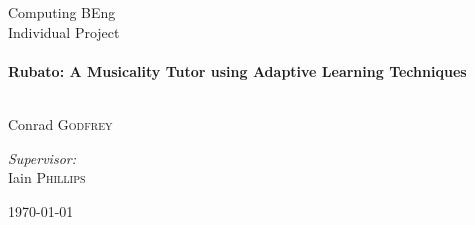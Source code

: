 \begin{titlepage}
    \begin{center}
        \large Computing BEng \\[0.5cm]
        \large Individual Project \\[0.5cm]
        \HRule \\[0.4cm]
        {\huge \bfseries Rubato: A Musicality Tutor using Adaptive Learning Techniques\\[0.4cm]}
        \HRule \\[1.5cm]
            \begin{flushleft}
                \large               
                Conrad \textsc{Godfrey}\\
            \end{flushleft}
            \begin{flushright}
                \large
                \emph{Supervisor:}\\
                Iain \textsc{Phillips}
            \end{flushright}
        \vfill
        {\large \today}
    \end{center}
\end{titlepage}
